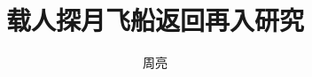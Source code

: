 \documentclass[master,ttf]{nudtpaper}
\title{载人探月飞船返回再入研究}
\author{周亮}
\begin{document}
\graphicspath{{figures/}}
\maketitle
\frontmatter

\newif\ifreview\reviewfalse
\midmatter
% 
% 

\mainmatter
% 
% 



% 

% 
% 

% 
\appendix
\backmatter
% 
\end{document}
